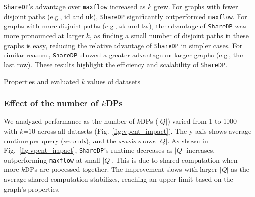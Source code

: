 \texttt{ShareDP}'s advantage over \texttt{maxflow} increased as $k$ grew. For graphs with fewer disjoint paths (e.g., id and uk), \texttt{ShareDP} significantly outperformed \texttt{maxflow}. For graphs with more disjoint paths (e.g., sk and tw), the advantage of \texttt{ShareDP} was more pronounced at larger $k$, as finding a small number of disjoint paths in these graphs is easy, reducing the relative advantage of \texttt{ShareDP} in simpler cases. For similar reasons, \texttt{ShareDP} showed a greater advantage on larger graphs (e.g., the last row). These results highlight the efficiency and scalability of \texttt{ShareDP}.


\begin{table}[!h]
    \centering
    \caption{Properties and evaluated $k$ values of datasets}
    {
        
    }
    \label{tab:datasets}
\end{table}

\subsubsection{Effect of the number of $k$DPs}\label{sec:experiment_instance_number}

We analyzed performance as the number of $k$DPs ($|Q|$) varied from 1 to 1000 with $k$=$10$ across all datasets (Fig.~\ref{fig:vpcnt_impact}).  
The y-axis shows average runtime per query (seconds), and the x-axis shows $|Q|$.
As shown in Fig.~\ref{fig:vpcnt_impact}, \texttt{ShareDP}'s runtime decreases as $|Q|$ increases, outperforming \texttt{maxflow} at small $|Q|$.  
This is due to shared computation when more $k$DPs are processed together.  
The improvement slows with larger $|Q|$ as the average shared computation stabilizes, reaching an upper limit based on the graph’s properties.

